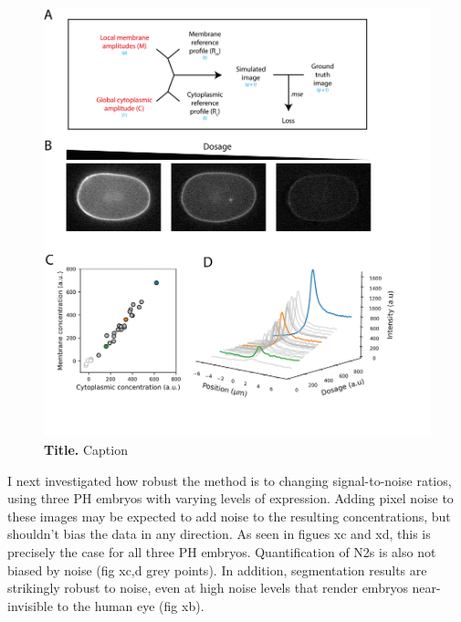 \documentclass[12pt]{"article"}
\newcommand{\mycaption}[2]{\caption[#1]{\textbf{#1.} #2}}
\begin{document}
\begin{figure}[!h]
\includegraphics[scale=1]{memquant_benchmarking_ph_rundown}
\setlength{\abovecaptionskip}{20pt}
\centering
\mycaption{Title}{Caption}
\end{figure}

I next investigated how robust the method is to changing signal-to-noise ratios, using three PH embryos with varying levels of expression. Adding pixel noise to these images may be expected to add noise to the resulting concentrations, but shouldn’t bias the data in any direction. As seen in figues xc and xd, this is precisely the case for all three PH embryos. Quantification of N2s is also not biased by noise (fig xc,d grey points). In addition, segmentation results are strikingly robust to noise, even at high noise levels that render embryos near-invisible to the human eye (fig xb).\\
\end{document}
